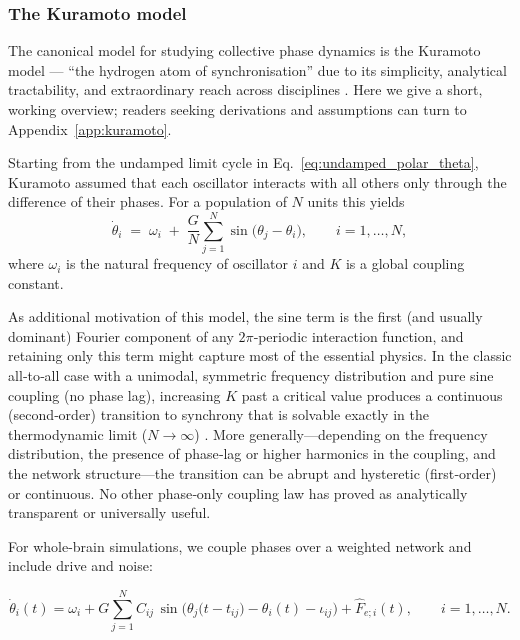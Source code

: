 \documentclass[12pt]{article}
\numberwithin{equation}{section}
\begin{document}
\subsubsection{The Kuramoto model}
 

The canonical model for studying collective phase dynamics is the Kuramoto model ---  “the hydrogen atom of synchronisation” due to its simplicity, analytical tractability, and extraordinary reach across disciplines 
\cite{kuramotoSelfentrainmentPopulationCoupled1975,Winfree2001,strogatz_nonlinear_2015,acebronKuramotoModelSimple2005}. Here we give a short, working overview; readers seeking derivations and assumptions can turn to  Appendix~\ref{app:kuramoto}. 

Starting from the undamped limit cycle in Eq.~\eqref{eq:undamped_polar_theta}, Kuramoto assumed that each oscillator interacts with all others only through the difference of their phases.  For a population of $N$ units this yields  
\begin{equation}
    \dot{\theta}_{i}
    \;=\;
    \omega_{i}
    \;+\;
    \frac{G}{N}
    \sum_{j=1}^{N}
    \sin\!\bigl(\theta_{j}-\theta_{i}\bigr),
    \qquad
    i=1,\dots,N,
    \label{eq:kuramoto_original}
\end{equation}
where $\omega_{i}$ is the natural frequency of oscillator $i$ and $K$ is a global coupling constant.

As additional motivation of this model, the sine term is the first (and usually dominant) Fourier component of any $2\pi$‑periodic interaction function\cite{Ermentrout2010}, and retaining only this term might capture most of the essential physics.
In the classic all‑to‑all case with a unimodal, symmetric frequency distribution and pure sine coupling (no phase lag), increasing $K$ past a critical value produces a continuous (second‑order) transition to synchrony that is solvable exactly in the thermodynamic limit ($N\to\infty$) \cite{strogatzKuramotoCrawfordExploring2000}.
More generally—depending on the frequency distribution, the presence of phase‑lag or higher harmonics in the coupling, and the network structure—the transition can be abrupt and hysteretic (first‑order) or continuous.
No other phase‑only coupling law has proved as analytically transparent or universally useful.

\noindent
For whole-brain simulations, we couple phases over a weighted network and include drive and noise:

\begin{tcolorbox}[
  colback=gray!5,
  colframe=gray!5,   %
  boxrule=0pt,       %
  enhanced, sharp corners,
  left=4pt,right=4pt,top=3pt,bottom=3pt,
  boxsep=2pt,
  before skip=6pt, after skip=6pt
]
\begin{equation}
\dot{\theta}_i(t)
=
\omega_i
+
G\sum_{j=1}^{N} C_{ij}\,
\sin\!\Big(\theta_j\!\big(t-t_{ij}\big)-\theta_i(t)-\iota_{ij}\Big)
+
\hat F_{e;i}(t),
\qquad i=1,\dots,N.
\label{eq:kuramoto_connectome}
\end{equation}
\end{tcolorbox}
\end{document}

